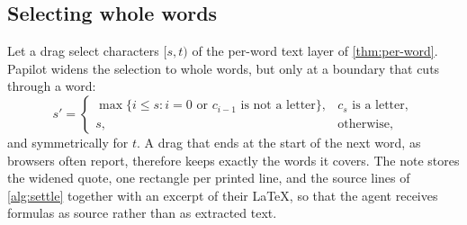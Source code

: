 \subsection{Selecting whole words}

Let a drag select characters $[s, t)$ of the per-word text layer of
\cref{thm:per-word}. Papilot widens the selection to whole words, but only at
a boundary that cuts through a word:
\begin{equation}
  s' = \begin{cases}
    \max\{ i \le s : \text{$i = 0$ or $c_{i-1}$ is not a letter} \}, &
      c_s \text{ is a letter},\\
    s, & \text{otherwise},
  \end{cases}
  \label{eq:whole-words}
\end{equation}
and symmetrically for $t$. A drag that ends at the start of the next word, as
browsers often report, therefore keeps exactly the words it covers. The note
stores the widened quote, one rectangle per printed line, and the source lines
of \cref{alg:settle} together with an excerpt of their \LaTeX{}, so that the
agent receives formulas as source rather than as extracted text.
